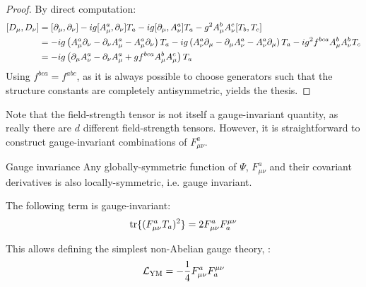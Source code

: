\begin{proofbox}
  \begin{proof}
    By direct computation:
    \begin{equation*}
      \begin{split}
        [D_\mu , D_\nu]
        & = [\partial_\mu , \partial_\nu] - i g [A_\mu^a , \partial_\nu] T_a - i g [\partial_\mu , A_\nu^a] T_a - g^2 A_\mu^b A_\nu^c [T_b , T_c] \\
        & = - i g \left( A_\mu^a \partial_\nu - \partial_\nu A_\mu^a - A_\mu^a \partial_\nu \right) T_a - i g \left( A_\nu^a \partial_\mu - \partial_\mu A_\nu^a - A_\nu^a \partial_\mu \right) T_a - i g^2 f^{bca} A_\mu^b A_\nu^b T_c \\
        & = - i g \left( \partial_\mu A_\nu^a - \partial_\nu A_\mu^a + g f^{bca} A_\mu^b A_\mu^c \right) T_a
      \end{split}
    \end{equation*}
    Using $ f^{bca} = f^{abc} $, as it is always possible to choose generators such that the structure constants are completely antisymmetric\footnotemark, yields the thesis.
  \end{proof}
\end{proofbox}


Note that the field-strength tensor is not itself a gauge-invariant quantity, as really there are $ d $ different field-strength tensors. However, it is straightforward to construct gauge-invariant combinations of $ F_{\mu \nu}^a $.

\begin{theorem}{Gauge invariance}{}
  Any globally-symmetric function of $ \Psi $, $ F_{\mu \nu}^a $ and their covariant derivatives is also locally-symmetric, i.e. gauge invariant.
\end{theorem}

\begin{lemma}
  The following term is gauge-invariant:
  \begin{equation}
    \operatorname{tr} \{(F_{\mu \nu}^a T_a)^2\} = 2 F_{\mu \nu}^a F^{\mu \nu}_a
  \end{equation}
\end{lemma}

This allows defining the simplest non-Abelian gauge theory, :
\begin{equation}
  \mathcal{L}_\text{YM} = - \frac{1}{4} F_{\mu \nu}^a F^{\mu \nu}_a
\end{equation}
